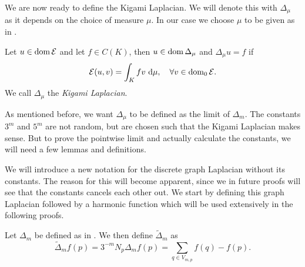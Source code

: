 We are now ready to define the Kigami Laplacian. We will denote this with $\Delta_{\mu}$ as it depends on the choice of measure $\mu$. In our case we choose $\mu$ to be given as in .

\medskip
\begin{defi}
	Let $u \in \operatorname{dom} \mathcal{E}$ and let $f \in C(K)$, then $u \in \operatorname{dom} \Delta_{\mu}$ and $\Delta_{\mu} u =f$ if
	\begin{equation}
		\mathcal{E}(u,v) = \int_{K}fv \ \text{d} \mu, \quad \forall v \in \operatorname{dom}_{0}\mathcal{E}.
	\end{equation}
	We call $\Delta_{\mu}$ the \emph{Kigami Laplacian}.
\end{defi}

As mentioned before, we want $\Delta_{\mu}$ to be defined as the limit of $\Delta_m$. The constants $3^m$ and $5^m$ are not random, but are  chosen such that the Kigami Laplacian makes sense. But to prove the pointwise limit and actually calculate the constants, we will need a few lemmas and definitions. 

We will introduce a new notation for the discrete graph Laplacian without its constants. The reason for this will become apparent, since we in future proofs will see that the constants cancels each other out. We start by defining this graph Laplacian followed by a harmonic function which will be used extensively in the following proofs.

\medskip
\begin{defi}
	Let $\Delta_{m}$ be defined as in . We then define $\widetilde{\Delta}_m$ as
	\begin{equation}
		\widetilde{\Delta}_{m}f(p) = 3^{-m} N_p \Delta_mf(p) = \sum_{q \in V_{m, p}} f(q)-f(p).
	\end{equation}
\end{defi}

